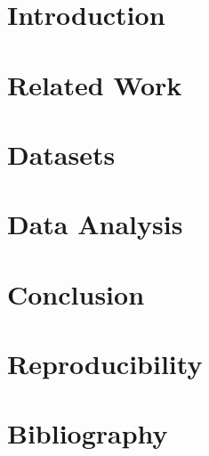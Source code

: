 \documentclass[headsepline,chapterprefix=on,footinclude=false,oneside,fontsize=11pt,paper=a4,listof=totoc,bibliography=totoc]{scrbook} %
\begin{document}


\frontmatter{}
\newpage\null\thispagestyle{empty}\newpage


\newpage\null\thispagestyle{empty}\newpage

\newpage\null\thispagestyle{empty}\newpage

\newpage\null\thispagestyle{empty}\newpage

\tableofcontents{}
\listoffigures{}
\listoftables{}
\mainmatter{}
\part*{Introduction}

\part*{Related Work}

\part*{Datasets}

\part*{Data Analysis}




\part*{Conclusion}

\part*{Reproducibility}



\appendix{}\label{appendix}
\appendixpage
\addappheadtotoc

\newpage\null\thispagestyle{empty}\newpage
\part*{Bibliography}
\printbibliography{}
\end{document}

